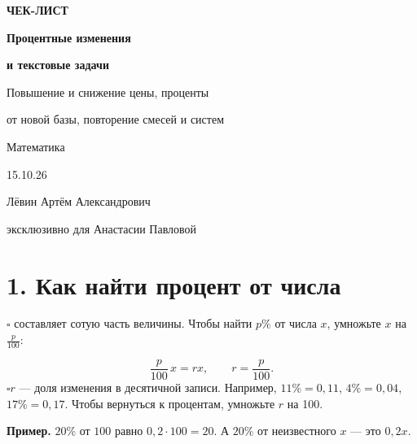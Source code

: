 \documentclass[a4paper,12pt]{article}
\newcommand{\checkitem}[1]{\noindent\(\square\)\enspace #1\par}
\newcommand{\keyterm}[1]{{\color{darkaccent}\textbf{#1}}}
\begin{document}
\setlength{\abovedisplayskip}{7pt}
\setlength{\belowdisplayskip}{7pt}
\setlength{\abovedisplayshortskip}{4pt}
\setlength{\belowdisplayshortskip}{5pt}
\begin{titlepage}
\thispagestyle{empty}
\begin{center}
\vspace*{38mm}
{\Large\color{accent}\bfseries ЧЕК-ЛИСТ\par}
\vspace{12mm}
{\Huge\color{darkaccent}\bfseries Процентные изменения\par}
\vspace{6mm}
{\LARGE\color{darkaccent}\bfseries и текстовые задачи\par}
\vspace{11mm}
{\Large Повышение и снижение цены, проценты\par}
{\Large от новой базы, повторение смесей и систем\par}
\vspace{22mm}
{\large Математика\par}
\vspace{11mm}
{\large 15.10.26\par}
\vfill
{\normalsize Лёвин Артём Александрович\par}
{\normalsize эксклюзивно для Анастасии Павловой\par}
\vspace{21mm}
\end{center}
\end{titlepage}
\setcounter{page}{2}

\section*{1. Как найти процент от числа}
\checkitem{\keyterm{Один процент} составляет сотую часть величины. Чтобы найти \(p\%\) от числа \(x\), умножьте \(x\) на \(\frac{p}{100}\):}
\[
\boxed{\frac{p}{100}\,x=rx,\qquad r=\frac{p}{100}.}
\]
\checkitem{\(r\) --- доля изменения в десятичной записи. Например, \(11\%=0{,}11\), \(4\%=0{,}04\), \(17\%=0{,}17\). Чтобы вернуться к процентам, умножьте \(r\) на 100.}
\textbf{Пример.} \(20\%\) от \(100\) равно \(0{,}2\cdot100=20\). А \(20\%\) от неизвестного \(x\) --- это \(0{,}2x\).
\end{document}
